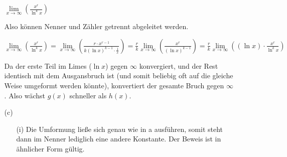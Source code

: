 \documentclass[a4paper,11pt,fleqn]{scrartcl}
\newcommand{\bra}[1]{\left(#1\right)}
\newcommand{\limx}[1]{\lim\limits_{x \rightarrow \infty}\bra{#1}}
\begin{document}
\begin{enumerate}
\begin{enumerate}
                \( \limx{ \frac{x^r}{\ln^k x} }\)

                Also können Nenner und Zähler getrennt abgeleitet werden.

                \( \limx{\frac{x^r}{\ln^k x}} = \limx{\frac{r \cdot x^{r-1}}{k\bra{\ln x}^{k-1} \cdot \frac{1}{x}}} =
                \frac{r}{k} \limx{ \frac{x^r}{\bra{\ln x}^{k-1}} } =
                \frac{r}{k} \limx{ \bra{\ln x} \cdot \frac{x^r}{\ln^k x} } \)

                Da der erste Teil im Limes ($\ln x$) gegen $\infty$ konvergiert,
                und der Rest identisch mit dem Ausgansbruch ist (und somit beliebig
                oft auf die gleiche Weise umgeformt werden könnte), konvertiert
                der gesamte Bruch gegen $\infty$. Also wächst $g(x)$ schneller als
                $h(x)$.

            \item[(c)]
                \begin{enumerate}
                \item[(i)]
                Die Umformung ließe sich genau wie in a ausführen, somit steht dann im Nenner lediglich eine andere Konstante. Der Beweis ist in ähnlicher Form gültig.
                \end{enumerate}
        \end{enumerate}
\end{enumerate}
\end{document}
